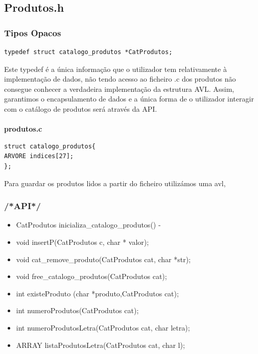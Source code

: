 \subsection{Produtos.h}

\subsubsection{Tipos Opacos}
\begin{verbatim}
typedef struct catalogo_produtos *CatProdutos;
\end{verbatim}

Este typedef é a única informação que o utilizador tem relativamente à implementação de dados, não tendo acesso ao ficheiro .c dos produtos não consegue conhecer a verdadeira implementação da estrutura AVL. Assim, garantimos o encapsulamento de dados e a única forma de o utilizador interagir com o catálogo de produtos será através da API. 

\paragraph{}
\textbf{produtos.c}

\begin{verbatim}
struct catalogo_produtos{
ARVORE indices[27];
};
\end{verbatim}

 Para guardar os produtos lidos a partir do ficheiro utilizámos uma avl,

\subsubsection{/*API*/}

\begin{itemize}
	
\item CatProdutos inicializa\_catalogo\_produtos() - 
\item void insertP(CatProdutos c, char * valor);
\item void cat\_remove\_produto(CatProdutos cat, char *str);
\item void free\_catalogo\_produtos(CatProdutos cat);
\item int existeProduto (char *produto,CatProdutos cat);
\item int numeroProdutos(CatProdutos cat);
\item int numeroProdutosLetra(CatProdutos cat, char letra);
\item ARRAY listaProdutosLetra(CatProdutos cat, char l);
\end{itemize}


